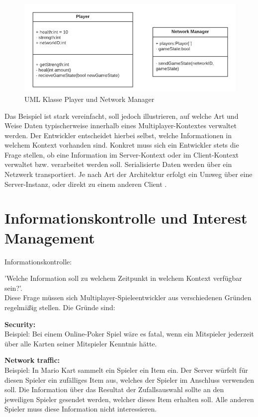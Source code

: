 \begin{figure}[H]
	\centering
	\includegraphics[width=130mm]{images/UML_class_Player_NM.png}
	\caption[UML Klassen]{UML Klasse Player und Network Manager}
	\label{pic:UML_class_Player_NM}
\end{figure}

Das Beispiel ist stark vereinfacht, soll jedoch illustrieren, auf welche Art und Weise Daten typischerweise innerhalb eines Multiplayer-Kontextes verwaltet werden. Der Entwickler entscheidet hierbei selbst, welche Informationen in welchem Kontext vorhanden sind. Konkret muss sich ein Entwickler stets die Frage stellen, ob eine Information im Server-Kontext oder im Client-Kontext verwaltet bzw. verarbeitet werden soll. Serialisierte Daten werden über ein Netzwerk transportiert. Je nach Art der Architektur erfolgt ein Umweg über eine Server-Instanz, oder direkt zu einem anderen Client \cite{Smed.2002c}.

\section{Informationskontrolle und Interest Management}

\textsf{\Large Informationskontrolle:}

'Welche Information soll zu welchem Zeitpunkt in welchem Kontext verfügbar sein?'. \\
Diese Frage müssen sich Multiplayer-Spieleentwickler aus verschiedenen Gründen regelmäßig stellen. Die Gründe sind:

\textbf{Security:} \\
Beispiel: Bei einem Online-Poker Spiel wäre es fatal, wenn ein Mitspieler jederzeit über alle Karten seiner Mitspieler Kenntnis hätte. 

\textbf{Network traffic:} \\
Beispiel: In Mario Kart sammelt ein Spieler ein Item ein. Der Server würfelt für diesen Spieler ein zufälliges Item aus, welches der Spieler im Anschluss verwenden soll. Die Information über das Resultat der Zufallsauswahl sollte an den jeweiligen Spieler gesendet werden, welcher dieses Item erhalten soll. Alle anderen Spieler muss diese Information nicht interessieren.
 
